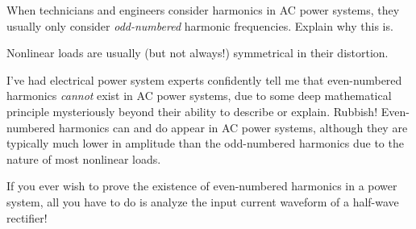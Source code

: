 

When technicians and engineers consider harmonics in AC power systems, they usually only consider {\it odd-numbered} harmonic frequencies.  Explain why this is.







Nonlinear loads are usually (but not always!) symmetrical in their distortion.







I've had electrical power system experts confidently tell me that even-numbered harmonics {\it cannot} exist in AC power systems, due to some deep mathematical principle mysteriously beyond their ability to describe or explain.  Rubbish!  Even-numbered harmonics can and do appear in AC power systems, although they are typically much lower in amplitude than the odd-numbered harmonics due to the nature of most nonlinear loads.

If you ever wish to prove the existence of even-numbered harmonics in a power system, all you have to do is analyze the input current waveform of a half-wave rectifier!





